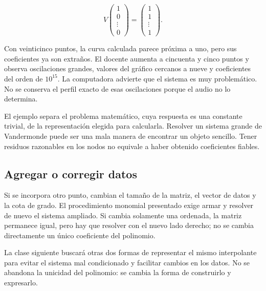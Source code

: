 \documentclass[12pt,a4paper]{article}
\begin{document}
\[
V\begin{pmatrix}1\\0\\\vdots\\0\end{pmatrix}
=\begin{pmatrix}1\\1\\\vdots\\1\end{pmatrix}.
\]

Con veinticinco puntos, la curva calculada parece próxima a uno, pero sus coeficientes ya son extraños. El docente aumenta a cincuenta y cinco puntos y observa oscilaciones grandes, valores del gráfico cercanos a nueve y coeficientes del orden de $10^{15}$. La computadora advierte que el sistema es muy problemático. No se conserva el perfil exacto de esas oscilaciones porque el audio no lo determina.

El ejemplo separa el problema matemático, cuya respuesta es una constante trivial, de la representación elegida para calcularla. Resolver un sistema grande de Vandermonde puede ser una mala manera de encontrar un objeto sencillo. Tener residuos razonables en los nodos no equivale a haber obtenido coeficientes fiables.

\subsection{Agregar o corregir datos}

Si se incorpora otro punto, cambian el tamaño de la matriz, el vector de datos y la cota de grado. El procedimiento monomial presentado exige armar y resolver de nuevo el sistema ampliado. Si cambia solamente una ordenada, la matriz permanece igual, pero hay que resolver con el nuevo lado derecho; no se cambia directamente un único coeficiente del polinomio.

La clase siguiente buscará otras dos formas de representar el mismo interpolante para evitar el sistema mal condicionado y facilitar cambios en los datos. No se abandona la unicidad del polinomio: se cambia la forma de construirlo y expresarlo.
\end{document}
